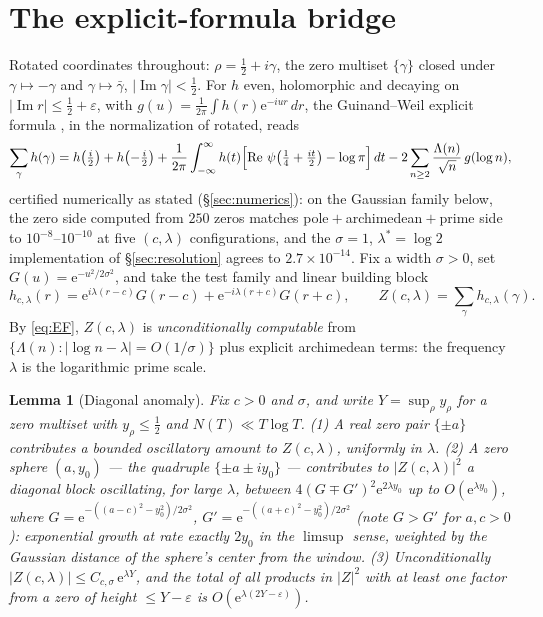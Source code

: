 \documentclass[11pt]{amsart}
\theoremstyle{plain}
\newtheorem{lemma}[theorem]{Lemma}
\theoremstyle{definition}
\theoremstyle{remark}
\newcommand{\re}{\operatorname{Re}}
\newcommand{\im}{\operatorname{Im}}
\newcommand{\eE}{\mathrm{e}}
\newcommand{\dd}{\,d}
\begin{document}
\section{The explicit-formula bridge}\label{sec:bridge}

Rotated coordinates throughout: $\rho=\tfrac12+i\gamma$, the zero multiset $\{\gamma\}$ closed
under $\gamma\mapsto-\gamma$ and $\gamma\mapsto\bar\gamma$, $|\im\gamma|<\tfrac12$. For $h$ even,
holomorphic and decaying on $|\im r|\le\tfrac12+\varepsilon$, with
$g(u)=\tfrac1{2\pi}\int h(r)\eE^{-iur}\dd r$, the Guinand--Weil explicit formula
\cite{Guinand1948,Weil1952}, in the normalization of \cite[Thm.~5.12]{IwaniecKowalski2004} rotated,
reads
\begin{equation}\label{eq:EF}
\sum_\gamma h(\gamma)=h\bigl(\tfrac i2\bigr)+h\bigl(-\tfrac i2\bigr)
+\frac1{2\pi}\int_{-\infty}^\infty h(t)\Bigl[\re\,\psi\bigl(\tfrac14+\tfrac{it}2\bigr)
-\log\pi\Bigr]\dd t
-2\sum_{n\ge2}\frac{\Lambda(n)}{\sqrt n}\,g(\log n),
\end{equation}
certified numerically as stated (\S\ref{sec:numerics}): on the Gaussian family below, the zero
side computed from $250$ zeros matches pole${}+{}$archimedean${}+{}$prime side to
$10^{-8}$--$10^{-10}$ at five $(c,\lambda)$ configurations, and the $\sigma=1$,
$\lambda^*=\log2$ implementation of \S\ref{sec:resolution} agrees to $2.7\times10^{-14}$. Fix a width $\sigma>0$, set
$G(u)=\eE^{-u^2/2\sigma^2}$, and take the test family and linear building block
\begin{equation}\label{eq:Z}
h_{c,\lambda}(r)=\eE^{i\lambda(r-c)}G(r-c)+\eE^{-i\lambda(r+c)}G(r+c),
\qquad
Z(c,\lambda)=\sum_\gamma h_{c,\lambda}(\gamma).
\end{equation}
By \eqref{eq:EF}, $Z(c,\lambda)$ is \emph{unconditionally computable} from
$\{\Lambda(n):|\log n-\lambda|=O(1/\sigma)\}$ plus explicit archimedean terms: the frequency
$\lambda$ is the logarithmic prime scale.

\begin{lemma}[Diagonal anomaly]\label{lem:anomaly}
Fix $c>0$ and $\sigma$, and write $Y=\sup_\rho y_\rho$ for a zero multiset with
$y_\rho\le\tfrac12$ and $N(T)\ll T\log T$. \textup{(1)} A real zero pair $\{\pm a\}$ contributes
a bounded oscillatory amount to $Z(c,\lambda)$, uniformly in $\lambda$. \textup{(2)} A zero
sphere $(a,y_0)$ --- the quadruple $\{\pm a\pm iy_0\}$ --- contributes to $|Z(c,\lambda)|^2$ a
diagonal block oscillating, for large $\lambda$, between $4(G\mp G')^2\eE^{2\lambda y_0}$ up to
$O(\eE^{\lambda y_0})$, where $G=\eE^{-((a-c)^2-y_0^2)/2\sigma^2}$,
$G'=\eE^{-((a+c)^2-y_0^2)/2\sigma^2}$ (note $G>G'$ for $a,c>0$): exponential growth at rate exactly
$2y_0$ in the $\limsup$ sense, weighted by the Gaussian distance of the sphere's center from the
window. \textup{(3)} Unconditionally $|Z(c,\lambda)|\le C_{c,\sigma}\,\eE^{\lambda Y}$, and the
total of all products in $|Z|^2$ with at least one factor from a zero of height
$\le Y-\varepsilon$ is $O(\eE^{\lambda(2Y-\varepsilon)})$.
\end{lemma}
\end{document}
